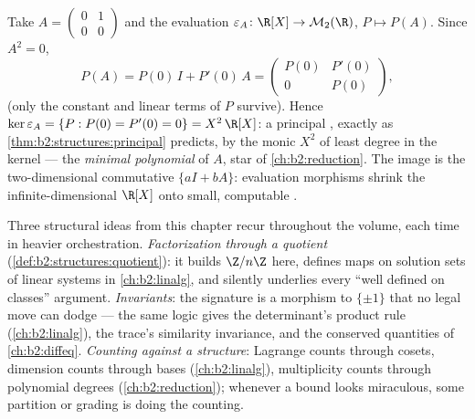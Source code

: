 \begin{example}\label{ex:b2:structures:evaluation}
Take $A = \begin{pmatrix}0 & 1\\ 0 & 0\end{pmatrix}$ and the
evaluation $\varepsilon_A \colon \R[X] \to \mathcal{M}_2(\R)$,
$P \mapsto P(A)$. Since $A^2 = 0$,
\[
P(A) = P(0)\,I + P'(0)\,A =
\begin{pmatrix} P(0) & P'(0)\\ 0 & P(0)\end{pmatrix},
\]
(only the constant and linear terms of $P$ survive). Hence
$\ker\varepsilon_A = \{P : P(0) = P'(0) = 0\} = X^2\,\R[X]$: a
principal , exactly as \cref{thm:b2:structures:principal}
predicts,  by the monic $X^2$ of least degree in the
kernel --- the \emph{minimal polynomial} of $A$, star of
\cref{ch:b2:reduction}. The image is the two-dimensional
commutative  $\{aI + bA\}$: evaluation morphisms shrink
the infinite-dimensional $\R[X]$ onto small, computable .
\end{example}

\begin{remark}\label{rem:b2:structures:perspectives}
Three structural ideas from this chapter recur throughout the
volume, each time in heavier orchestration. \emph{Factorization
through a quotient} (\cref{def:b2:structures:quotient}): it
builds $\Z/n\Z$ here, defines maps on solution sets of linear
systems in \cref{ch:b2:linalg}, and silently underlies every
``well defined on classes'' argument. \emph{Invariants}: the
signature is a morphism to $\{\pm1\}$ that no legal move can
dodge --- the same logic gives the determinant's product rule
(\cref{ch:b2:linalg}), the trace's similarity invariance, and
the conserved quantities of \cref{ch:b2:diffeq}.
\emph{Counting against a structure}: Lagrange counts through
cosets, dimension counts through bases
(\cref{ch:b2:linalg}), multiplicity counts through polynomial
degrees (\cref{ch:b2:reduction}); whenever a bound looks
miraculous, some partition or grading is doing the counting.
\end{remark}

